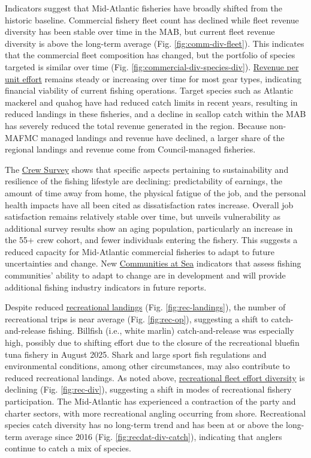 \documentclass[
  10pt,
]{article}
\begin{document}
Indicators suggest that Mid-Atlantic fisheries have broadly shifted from the historic baseline. Commercial fishery fleet count has declined while fleet revenue diversity has been stable over time in the MAB, but current fleet revenue diversity is above the long-term average (Fig. \ref{fig:comm-div-fleet}). This indicates that the commercial fleet composition has changed, but the portfolio of species targeted is similar over time (Fig. \ref{fig:commercial-div-species-div}). \href{https://noaa-edab.github.io/catalog/effective_sweptarea.html}{Revenue per unit effort} remains steady or increasing over time for most gear types, indicating financial viability of current fishing operations. Target species such as Atlantic mackerel and quahog have had reduced catch limits in recent years, resulting in reduced landings in these fisheries, and a decline in scallop catch within the MAB has severely reduced the total revenue generated in the region. Because non-MAFMC managed landings and revenue have declined, a larger share of the regional landings and revenue come from Council-managed fisheries.

The \href{https://noaa-edab.github.io/catalog/crew_survey.html}{Crew Survey} shows that specific aspects pertaining to sustainability and resilience of the fishing lifestyle are declining: predictability of earnings, the amount of time away from home, the physical fatigue of the job, and the personal health impacts have all been cited as dissatisfaction rates increase. Overall job satisfaction remains relatively stable over time, but unveils vulnerability as additional survey results show an aging population, particularly an increase in the 55+ crew cohort, and fewer individuals entering the fishery. This suggests a reduced capacity for Mid-Atlantic commercial fisheries to adapt to future uncertainties and change. New \href{https://noaa-edab.github.io/catalog/communities_at_sea.html}{Communities at Sea} indicators that assess fishing communities' ability to adapt to change are in development and will provide additional fishing industry indicators in future reports.

Despite reduced \href{https://noaa-edab.github.io/catalog/recdat.html}{recreational landings} (Fig. \ref{fig:rec-landings}), the number of recreational trips is near average (Fig. \ref{fig:rec-op}), suggesting a shift to catch-and-release fishing. Billfish (i.e., white marlin) catch-and-release was especially high, possibly due to shifting effort due to the closure of the recreational bluefin tuna fishery in August 2025. Shark and large sport fish regulations and environmental conditions, among other circumstances, may also contribute to reduced recreational landings. As noted above, \href{https://noaa-edab.github.io/catalog/recdat.html}{recreational fleet effort diversity} is declining (Fig. \ref{fig:rec-div}), suggesting a shift in modes of recreational fishery participation. The Mid-Atlantic has experienced a contraction of the party and charter sectors, with more recreational angling occurring from shore. Recreational species catch diversity has no long-term trend and has been at or above the long-term average since 2016 (Fig. \ref{fig:recdat-div-catch}), indicating that anglers continue to catch a mix of species.
\end{document}
